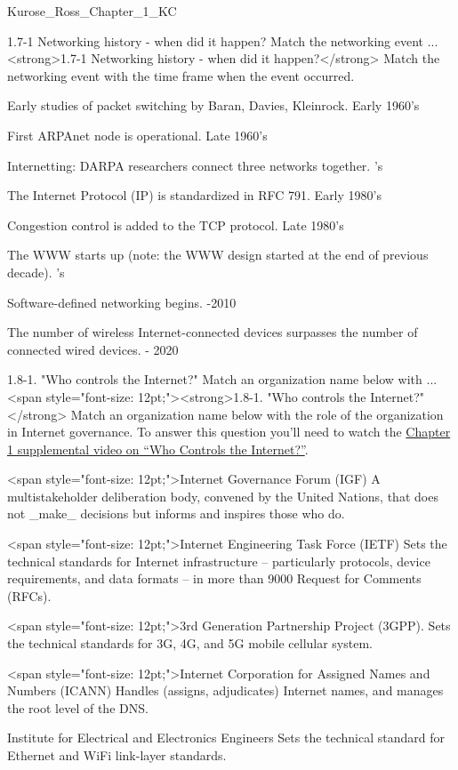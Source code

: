 \documentclass[a4paper,twocolumn]{article}
\begin{document}
\begin{quiz}{Kurose_Ross_Chapter_1_KC}
\begin{matching}[
	points=1,
	penalty=0.33333,
]{1.7-1 Networking history - when did it happen? Match the networking event ...}
<strong>1.7-1 Networking history - when did it happen?</strong> Match the networking event with the time frame when the event occurred.
\item Early studies of packet switching by Baran, Davies, Kleinrock. \answer Early 1960's
\item First ARPAnet node is operational. \answer Late 1960's
\item Internetting: DARPA researchers connect three networks together. 's
\item The Internet Protocol (IP) is standardized in RFC 791. \answer Early 1980's
\item Congestion control is added to the TCP protocol. \answer Late 1980's
\item The WWW starts up (note: the WWW design started at the end of previous decade). 's
\item Software-defined networking begins. -2010
\item The number of wireless Internet-connected devices surpasses the number of connected wired devices.  - 2020
\end{matching}

\begin{matching}[
	points=1,
	penalty=0.33333,
]{1.8-1.  "Who controls the Internet?"  Match an organization name below with ...}
<span style="font-size: 12pt;"><strong>1.8-1.  "Who controls the Internet?"</strong>  Match an organization name below with the role of the organization in Internet governance. To answer this question you’ll need to watch the \href{https://www.youtube.com/watch?v=xrd4hD_9fS8}{Chapter 1 supplemental video on “Who Controls the Internet?”}.
\item <span style="font-size: 12pt;">Internet Governance Forum (IGF)  \answer A multistakeholder deliberation body, convened by the United Nations, that does not _make_ decisions but informs and inspires those who do.
\item <span style="font-size: 12pt;">Internet Engineering Task Force (IETF) \answer Sets the technical standards for Internet infrastructure -- particularly protocols, device requirements, and data formats -- in more than 9000 Request for Comments (RFCs).
\item <span style="font-size: 12pt;">3rd Generation Partnership Project (3GPP). \answer Sets the technical standards for 3G, 4G, and 5G mobile cellular system.
\item <span style="font-size: 12pt;">Internet Corporation for Assigned Names and Numbers (ICANN) \answer Handles (assigns, adjudicates) Internet names, and manages the root level of the DNS.
\item Institute for Electrical and Electronics Engineers \answer Sets the technical standard for Ethernet and WiFi link-layer standards.
\end{matching}


\end{quiz}
\end{document}
